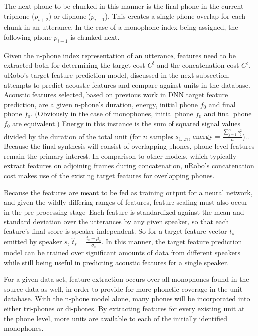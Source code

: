 \documentclass[10pt, journal, compsoc]{IEEEtran}
\begin{document}
The next phone to be chunked in this manner is the final phone in the current triphone ($p_{i+2}$) or diphone ($p_{i+1}$). This creates a single phone overlap for each chunk in an utterance. In the case of a monophone index being assigned, the following phone $p_{i+1}$ is chunked next.\par
Given the n-phone index representation of an utterance, features need to be extracted both for determining the target cost $C^t$ and the concatenation cost $C^c$. uRobo's target feature prediction model, discussed in the next subsection, attempts to predict acoustic features and compare against units in the database. Acoustic features selected, based on previous work in DNN target feature prediction, are a given n-phone's duration, energy, initial phone $f_0$ and final phone $f_0$. (Obviously in the case of monophones, initial phone $f_0$ and final phone $f_0$ are equivalent.) Energy in this instance is the sum of squared signal values divided by the duration of the total unit (for $n$ samples $s_{1...n}$, $\textrm{energy}=\frac{\sum_{j=1}^n s_j^2}{n}$).\cite{Jurafsky:2009:SLP:1214993}. Because the final synthesis will consist of overlapping phones, phone-level features remain the primary interest. In comparison to other models, which typically extract features on adjoining frames during concatenation\cite{a102c4924c19470ab180d278d2029de5}, uRobo's concatenation cost makes use of the existing target features for overlapping phones.\par
Because the features are meant to be fed as training output for a neural network, and given the wildly differing ranges of features, feature scaling must also occur in the pre-processing stage. Each feature is standardized against the mean and standard deviation over the utterances by any given speaker, so that each feature's final score is speaker independent. So for a target feature vector $t_{s}$ emitted by speaker $s$, $\hat{t}_s=\frac{t_s-\mu_s}{\sigma_s}$\cite{Beigi:2011:FSR:2124400}. In this manner, the target feature prediction model can be trained over significant amounts of data from different speakers while still being useful in predicting acoustic features for a single speaker.\par
For a given data set, feature extraction occurs over all monophones found in the source data as well, in order to provide for more phonetic coverage in the unit database. With the n-phone model alone, many phones will be incorporated into either tri-phones or di-phones. By extracting features for every existing unit at the phone level, more units are available to each of the initially identified monophones.
\end{document}
